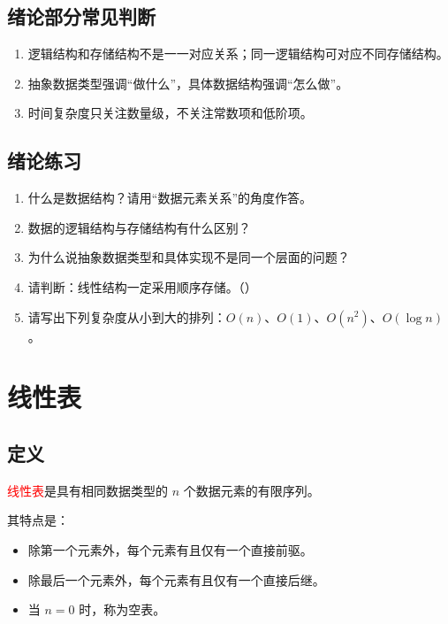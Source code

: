 \documentclass{../../note}
\begin{document}
\subsection{绪论部分常见判断}

\begin{enumerate}
  \item 逻辑结构和存储结构不是一一对应关系；同一逻辑结构可对应不同存储结构。
  \item 抽象数据类型强调“做什么”，具体数据结构强调“怎么做”。
  \item 时间复杂度只关注数量级，不关注常数项和低阶项。
\end{enumerate}

\subsection{绪论练习}

\begin{enumerate}
  \item 什么是数据结构？请用“数据元素关系”的角度作答。
  \item 数据的逻辑结构与存储结构有什么区别？
  \item 为什么说抽象数据类型和具体实现不是同一个层面的问题？
  \item 请判断：线性结构一定采用顺序存储。（\hspace{1cm}）
  \item 请写出下列复杂度从小到大的排列：$O(n)$、$O(1)$、$O(n^2)$、$O(\log n)$。
\end{enumerate}

\section{线性表}

\subsection{定义}

\textcolor{red}{线性表}是具有相同数据类型的 $n$ 个数据元素的有限序列。

其特点是：

\begin{itemize}
  \item 除第一个元素外，每个元素有且仅有一个直接前驱。
  \item 除最后一个元素外，每个元素有且仅有一个直接后继。
  \item 当 $n=0$ 时，称为空表。
\end{itemize}
\end{document}
